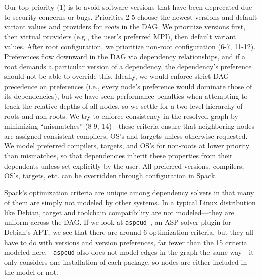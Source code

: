 Our top priority (1) is to avoid software versions that have been deprecated due to
security concerns or bugs. Priorities 2-5 choose the newest versions and default variant
values and providers for {\it roots} in the DAG. We prioritize versions first, then
virtual providers (e.g., the user's preferred MPI), then default variant values. After
root configuration, we prioritize non-root configuration (6-7, 11-12). Preferences flow
downward in the DAG via dependency relationships, and if a root demands a particular
version of a dependency, the dependency's preference should not be able to override
this. Ideally, we would enforce strict DAG precedence on preferences (i.e., every node's
preference would dominate those of its dependencies), but we have seen performance
penalties when attempting to track the relative depths of all nodes, so we settle for a
two-level hierarchy of roots and non-roots. We try to enforce consistency in the
resolved graph by minimizing ``mismatches'' (8-9, 14)---these criteria ensure that
neighboring nodes are assigned consistent compilers, OS's and targets unless otherwise
requested. We model preferred compilers, targets, and OS's for non-roots at lower
priority than mismatches, so that dependencies inherit these properties from their
dependents unless set explicitly by the user. All preferred versions, compilers, OS's,
targets, etc. can be overridden through configuration in Spack.

Spack's optimization criteria are unique among dependency solvers in that many of them
are simply not modeled by other systems. In a typical Linux distribution like Debian,
target and toolchain compatibility are not modeled---they are uniform across the DAG. If
we look at {\tt aspcud}~\cite{gebser+:2011-aspcud}, an ASP solver plugin for Debian's
APT, we see that there are around 6 optimization criteria, but they all have to do with
versions and version preferences, far fewer than the 15 criteria modeled here. {\tt
  aspcud} also does not model edges in the graph the same way---it only considers one
installation of each package, so nodes are either included in the model or not.
